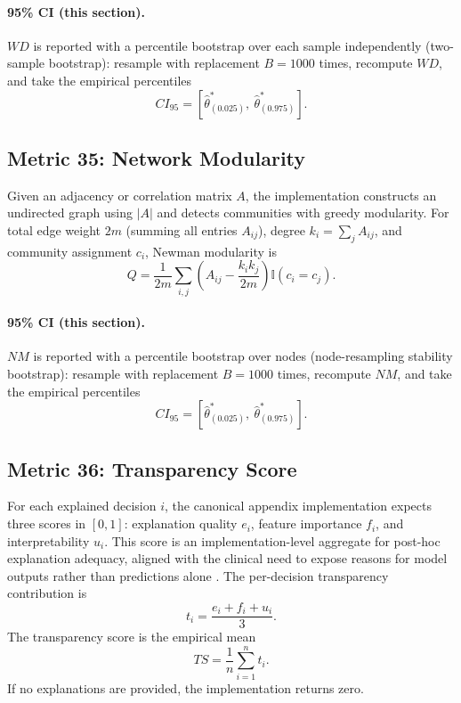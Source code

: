 \documentclass[11pt]{article}
\newcommand{\ind}{\mathbb{I}}
\begin{document}
\paragraph{95\% CI (this section).} $WD$ is reported with a percentile bootstrap over each sample independently (two-sample bootstrap): resample with replacement $B=1000$ times, recompute $WD$, and take the empirical percentiles
\begin{equation}
CI_{95}=\left[\hat\theta^{\ast}_{(0.025)},\ \hat\theta^{\ast}_{(0.975)}\right].
\end{equation}

\subsection{Metric 35: Network Modularity}

Given an adjacency or correlation matrix $A$, the implementation constructs an
undirected graph using $|A|$ and detects communities with greedy modularity.
For total edge weight $2m$ (summing all entries $A_{ij}$), degree
$k_i=\sum_j A_{ij}$, and community assignment $c_i$, Newman modularity is \cite{newman2006,clauset2004}
\begin{equation}
Q=\frac{1}{2m}\sum_{i,j}
\left(A_{ij}-\frac{k_i k_j}{2m}\right)\ind(c_i=c_j).
\end{equation}


\paragraph{95\% CI (this section).} $NM$ is reported with a percentile bootstrap over nodes (node-resampling stability bootstrap): resample with replacement $B=1000$ times, recompute $NM$, and take the empirical percentiles
\begin{equation}
CI_{95}=\left[\hat\theta^{\ast}_{(0.025)},\ \hat\theta^{\ast}_{(0.975)}\right].
\end{equation}

\subsection{Metric 36: Transparency Score}

For each explained decision $i$, the canonical appendix implementation expects
three scores in $[0,1]$: explanation quality $e_i$, feature importance $f_i$,
and interpretability $u_i$. This score is an implementation-level aggregate for
post-hoc explanation adequacy, aligned with the clinical need to expose reasons
for model outputs rather than predictions alone \cite{ribeiro2016}. The
per-decision transparency contribution is
\begin{equation}
t_i=\frac{e_i+f_i+u_i}{3}.
\end{equation}
The transparency score is the empirical mean
\begin{equation}
TS=\frac{1}{n}\sum_{i=1}^{n}t_i.
\end{equation}
If no explanations are provided, the implementation returns zero.
\end{document}

